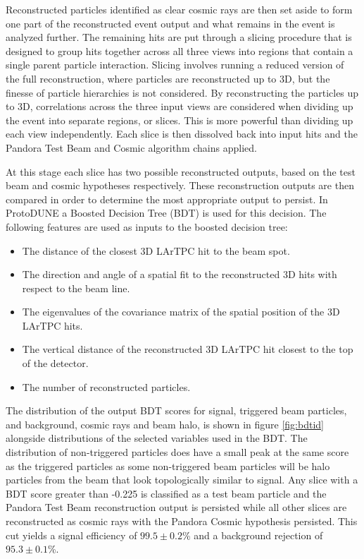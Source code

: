 Reconstructed particles identified as clear cosmic rays are then set aside to form one part of the reconstructed event output and what remains in the event is analyzed further.  The remaining hits are put through a slicing procedure that is designed to group hits together across all three views into regions that contain a single parent particle interaction.  Slicing involves running a reduced version of the full reconstruction, where particles are reconstructed up to 3D, but the finesse of particle hierarchies is not considered.  By reconstructing the particles up to 3D, correlations across the three input views are considered when dividing up the event into separate regions, or slices.  This is more powerful than dividing up each view independently.  Each slice is then dissolved back into input hits and the Pandora Test Beam and Cosmic algorithm chains applied.  

At this stage each slice has two possible reconstructed outputs, based on the test beam and cosmic hypotheses respectively.  These reconstruction outputs are then compared in order to determine the most appropriate output to persist.  In ProtoDUNE a Boosted Decision Tree (BDT) is used for this decision.  The following features are used as inputs to the boosted decision tree:

\begin{itemize}
\item The distance of the closest 3D LArTPC hit to the beam spot.
\item The direction and angle of a spatial fit to the reconstructed 3D hits with respect to the beam line.
\item The eigenvalues of the covariance matrix of the spatial position of the 3D LArTPC hits.
\item The vertical distance of the reconstructed 3D LArTPC hit closest to the top of the detector.
\item The number of reconstructed particles.
\end{itemize}

The distribution of the output BDT scores for signal, triggered beam particles, and background, cosmic rays and beam halo, is shown in figure \ref{fig:bdtid} alongside distributions of the selected variables used in the BDT.  The distribution of non-triggered particles does have a small peak at the same score as the triggered particles as some non-triggered beam particles will be halo particles from the beam that look topologically similar to signal.  Any slice with a BDT score greater than -0.225 is classified as a test beam particle and the Pandora Test Beam reconstruction output is persisted while all other slices are reconstructed as cosmic rays with the Pandora Cosmic hypothesis persisted.  This cut yields a signal efficiency of $99.5 \pm 0.2$\% and a background rejection of $95.3 \pm 0.1$\%.

